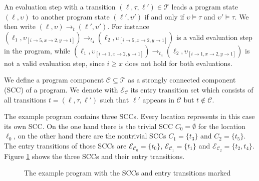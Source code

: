 An evaluation step with a transition $(\ell, \tau, \ell') \in \mathcal{T}$ leads a program state $(\ell, \upsilon)$ to another program state $(\ell', \upsilon')$ if and only if $\upsilon \models \tau$ and $\upsilon' \models \tau$. We then write $(\ell, \upsilon) \rightarrow_t (\ell', \upsilon')$.
For instance $(\ell_1,\upsilon_{[i \rightarrow 5, x \rightarrow 2, y \rightarrow 1]}) \rightarrow_{t_4} (\ell_2,\upsilon_{[i \rightarrow 5, x \rightarrow 2, y \rightarrow 1]})$ is a valid evaluation step in the program, while $(\ell_1,\upsilon_{[i \rightarrow 1, x \rightarrow 2, y \rightarrow 1]}) \rightarrow_{t_4} (\ell_2,\upsilon_{[i \rightarrow 1, x \rightarrow 2, y \rightarrow 1]})$ is not a valid evaluation step, since $i \geq x$ does not hold for both evaluations.

We define a program component $\mathcal{C} \subseteq \mathcal{T}$ as a strongly connected component (SCC) of a program.
We denote with $\mathcal{E}_\mathcal{C}$ its entry transition set which consists of all transitions $t = (\ell, \tau, \ell')$ such that $\ell'$ appears in $\mathcal{C}$ but $t \notin \mathcal{C}$.

The example program contains three SCCs. Every location represents in this case its own SCC. On the one hand there is the trivial SCC $C_0 = \emptyset$ for the location $\ell_0$, on the other hand there are the nontrivial SCCs $C_1 = \lbrace t_3 \rbrace$ and $C_2 = \lbrace t_5 \rbrace$.
The entry transitions of those SCCs are $\mathcal{E}_{\mathcal{C}_0} = \lbrace t_0 \rbrace$, $\mathcal{E}_{\mathcal{C}_1} = \lbrace t_1 \rbrace$ and $\mathcal{E}_{\mathcal{C}_2} = \lbrace t_2, t_4 \rbrace$.
Figure \ref{fig:sccs} shows the three SCCs and their entry transitions.

\begin{figure}
\centering
{}
\caption{The example program with the SCCs and entry transitions marked}
\label{fig:sccs}
\end{figure}

